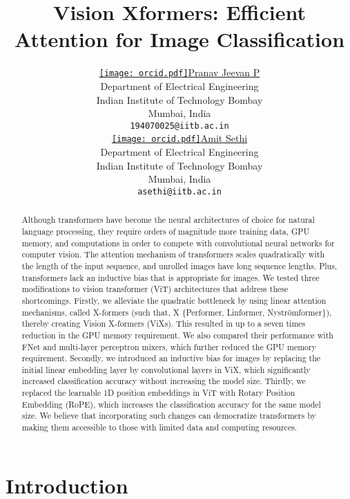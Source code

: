 \documentclass{article}
\title{Vision Xformers: Efficient Attention for Image Classification }
\author{ \href{https://orcid.org/0000-0003-4110-9638}{\texttt{[image: orcid.pdf]}\hspace{1mm}Pranav Jeevan P} \\
	Department of Electrical Engineering\\
	Indian Institute of Technology Bombay\\
	Mumbai, India  \\
	\texttt{194070025@iitb.ac.in} \\
\And
	\href{https://orcid.org/0000-0002-8003-6809}{\texttt{[image: orcid.pdf]}\hspace{1mm}Amit Sethi} \\
	Department of Electrical Engineering\\
	Indian Institute of Technology Bombay\\
	Mumbai, India \\
	\texttt{asethi@iitb.ac.in} \\
}
\date{}
\begin{document}
\maketitle

\begin{abstract}
Although transformers have become the neural architectures of choice for natural language processing, they require orders of magnitude more training data, GPU memory, and computations in order to compete with convolutional neural networks for computer vision. The attention mechanism of transformers scales quadratically with the length of the input sequence, and unrolled images have long sequence lengths. Plus, transformers lack an inductive bias that is appropriate for images. We tested three modifications to vision transformer (ViT) architectures that address these shortcomings. Firstly, we alleviate the quadratic bottleneck by using linear attention mechanisms, called X-formers (such that, X  \{Performer, Linformer, Nyströmformer\}), thereby creating Vision X-formers (ViXs). This resulted in up to a seven times reduction in the GPU memory requirement. We also compared their performance with FNet and multi-layer perceptron mixers, which further reduced the GPU memory requirement. Secondly, we introduced an inductive bias for images by replacing the initial linear embedding layer by convolutional layers in ViX, which significantly increased classification accuracy without increasing the model size. Thirdly, we replaced the learnable 1D position embeddings in ViT with Rotary Position Embedding (RoPE), which increases the classification accuracy for the same model size. We believe that incorporating such changes can democratize transformers by making them accessible to those with limited data and computing resources.

\end{abstract}


\section{Introduction}
\end{document}
